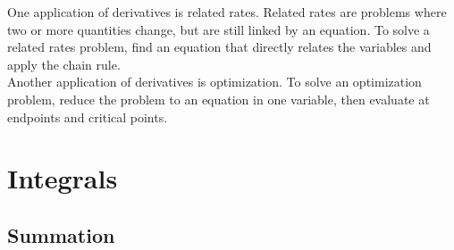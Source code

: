 \documentclass[11pt]{scrartcl}
\theoremstyle{plain}
\theoremstyle{definition}
\theoremstyle{remark}
\begin{document}
One application of derivatives is related rates. Related rates are problems where two or more quantities change,
but are still linked by an equation. To solve a related rates problem, find an equation that directly relates 
the variables and apply the chain rule. \\

Another application of derivatives is optimization. To solve an optimization problem, reduce the problem to an
equation in one variable, then evaluate at endpoints and critical points.

\newpage
\section{Integrals}
\subsection{Summation}
\end{document}
